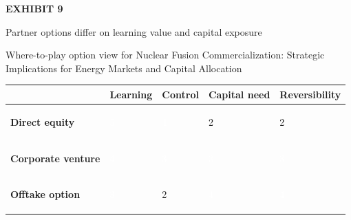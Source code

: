 \documentclass[10pt,a4paper]{article}
\begin{document}
\clearpage
{\textcolor{BOGreen}{\scriptsize\bfseries EXHIBIT 9}}\par\vspace{3pt}
{\sffamily\fontsize{15}{19}\selectfont\color{BONavy} Partner options differ on learning value and capital exposure}\par
{\small\color{BOText} Where-to-play option view for Nuclear Fusion Commercialization: Strategic Implications for Energy Markets and Capital Allocation}\par\vspace{4pt}
{\scriptsize\begin{tabular}{p{38mm}>{\centering\arraybackslash}p{21mm}>{\centering\arraybackslash}p{21mm}>{\centering\arraybackslash}p{21mm}>{\centering\arraybackslash}p{21mm}}
 & {\bfseries Learning} & {\bfseries Control} & {\bfseries Capital need} & {\bfseries Reversibility} \\
\hline
{\bfseries Direct equity} & \colorbox{BOGreen}{\textcolor{white}{\strut\hspace{5pt}5\hspace{5pt}}} & \colorbox{BOGreen}{\textcolor{white}{\strut\hspace{5pt}4\hspace{5pt}}} & \colorbox{BOLight}{\textcolor{BOText}{\strut\hspace{5pt}2\hspace{5pt}}} & \colorbox{BOLight}{\textcolor{BOText}{\strut\hspace{5pt}2\hspace{5pt}}} \\
{\bfseries Corporate venture} & \colorbox{BOGreen}{\textcolor{white}{\strut\hspace{5pt}4\hspace{5pt}}} & \colorbox{BOBlue}{\textcolor{white}{\strut\hspace{5pt}3\hspace{5pt}}} & \colorbox{BOBlue}{\textcolor{white}{\strut\hspace{5pt}3\hspace{5pt}}} & \colorbox{BOBlue}{\textcolor{white}{\strut\hspace{5pt}3\hspace{5pt}}} \\
{\bfseries Offtake option} & \colorbox{BOBlue}{\textcolor{white}{\strut\hspace{5pt}3\hspace{5pt}}} & \colorbox{BOLight}{\textcolor{BOText}{\strut\hspace{5pt}2\hspace{5pt}}} & \colorbox{BOGreen}{\textcolor{white}{\strut\hspace{5pt}4\hspace{5pt}}} & \colorbox{BOGreen}{\textcolor{white}{\strut\hspace{5pt}4\hspace{5pt}}} \\

\end{tabular}}
\end{document}

